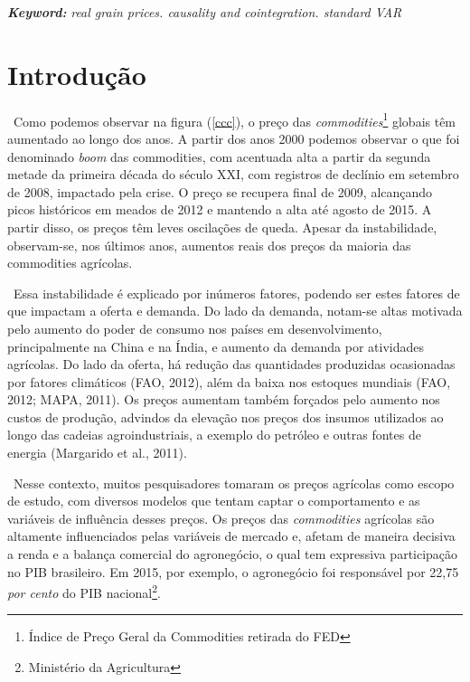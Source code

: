 \documentclass[a4paper,12pt,oneside,titlepage]{article}
\begin{document}
	
	\vspace{12 pt} 
	
\noindent
	\textbf{\textit{Keyword:}} \textit{real grain prices. causality and cointegration. standard VAR}


\section{Introdução}

\ Como podemos observar na figura (\ref{ccc}), o preço das \textit{commodities}\footnote{Índice de Preço Geral da Commodities retirada do FED} globais têm aumentado ao longo dos anos. A partir dos anos 2000 podemos observar o que foi denominado \textit{boom} das commodities, com acentuada alta a partir da segunda metade da primeira década do século XXI, com registros de declínio em setembro de 2008, impactado pela crise. O preço se recupera final de 2009, alcançando
picos históricos em meados de 2012 e mantendo a alta até agosto de 2015. A partir disso, os preços têm leves oscilações de queda. Apesar da instabilidade,
observam-se, nos últimos anos, aumentos reais dos preços da
maioria das commodities agrícolas.

\ Essa instabilidade é explicado por inúmeros fatores, podendo ser estes fatores de que impactam a oferta e demanda. Do lado da
demanda, notam-se altas motivada pelo aumento do poder de consumo nos países em desenvolvimento, principalmente na China e na Índia, e aumento da demanda por atividades agrícolas.
Do lado da oferta, há redução das quantidades produzidas
ocasionadas por fatores climáticos (FAO, 2012), além da baixa
nos estoques mundiais (FAO, 2012; MAPA, 2011). Os preços
aumentam também forçados pelo aumento nos custos de
produção, advindos da elevação nos preços dos insumos
utilizados ao longo das cadeias agroindustriais, a exemplo
do petróleo e outras fontes de energia (Margarido et al., 2011).

\ Nesse contexto, muitos pesquisadores tomaram os preços agrícolas como escopo de estudo, com diversos modelos que tentam captar o comportamento e as variáveis de influência desses preços. Os preços das \textit{commodities} agrícolas são altamente influenciados pelas variáveis de mercado e, afetam de maneira decisiva a renda
e a balança comercial do agronegócio, o qual tem expressiva
participação no PIB brasileiro. Em 2015, por exemplo, o agronegócio
foi responsável por 22,75 \textit{por cento} do PIB nacional\footnote{Ministério da Agricultura}. 
\end{document}

